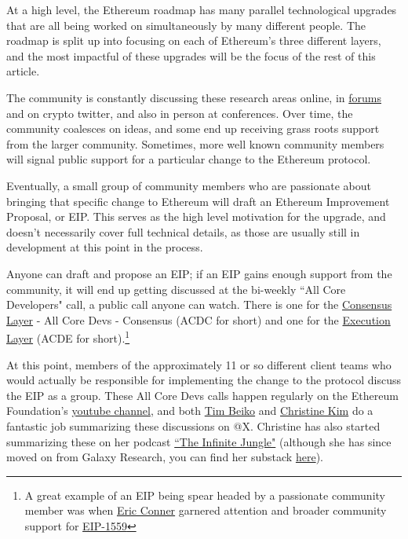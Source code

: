 \documentclass[12pt]{article}
\begin{document}
At a high level, the Ethereum roadmap has many parallel technological upgrades that are all being worked on simultaneously by many different people. The roadmap is split up into focusing on each of Ethereum's three different layers, and the most impactful of these upgrades will be the focus of the rest of this article. 

The community is constantly discussing these research areas online, in \href{https://ethresear.ch/}{forums} and on crypto twitter, and also in person at conferences. Over time, the community coalesces on ideas, and some end up receiving grass roots support from the larger community. Sometimes, more well known community members will signal public support for a particular change to the Ethereum protocol. 

Eventually, a small group of community members who are passionate about bringing that specific change to Ethereum will draft an Ethereum Improvement Proposal, or EIP. This serves as the high level motivation for the upgrade, and doesn't necessarily cover full technical details, as those are usually still in development at this point in the process.  

Anyone can draft and propose an EIP; if an EIP gains enough support from the community, it will end up getting discussed at the bi-weekly ``All Core Developers" call, a public call anyone can watch. There is one for the \href{https://www.youtube.com/watch?v=NQhTiMFDZHQ}{Consensus Layer} - All Core Devs - Consensus (ACDC for short) and one for the \href{https://www.youtube.com/live/1NIvzSliv44?si=0uX_tyXR5qaSijF7}{Execution Layer} (ACDE for short).\footnote{A great example of an EIP being spear headed by a passionate community member was when \href{https://twitter.com/econoar}{Eric Conner} garnered attention and broader community support for \href{https://eips.ethereum.org/EIPS/eip-1559}{EIP-1559}}

At this point, members of the approximately 11 or so different client teams who would actually be responsible for implementing the change to the protocol discuss the EIP as a group. These All Core Devs calls happen regularly on the Ethereum Foundation's \href{https://www.youtube.com/@EthereumProtocol}{youtube channel}, and both \href{https://x.com/TimBeiko}{Tim Beiko} and \href{https://twitter.com/christine_dkim}{Christine Kim} do a fantastic job summarizing these discussions on @X. Christine has also started summarizing these on her podcast \href{https://www.youtube.com/watch?v=ocW16DltZ74}{``The Infinite Jungle"} (although she has since moved on from Galaxy Research, you can find her substack \href{https://christinedkim.substack.com/}{here}).  
\end{document}
